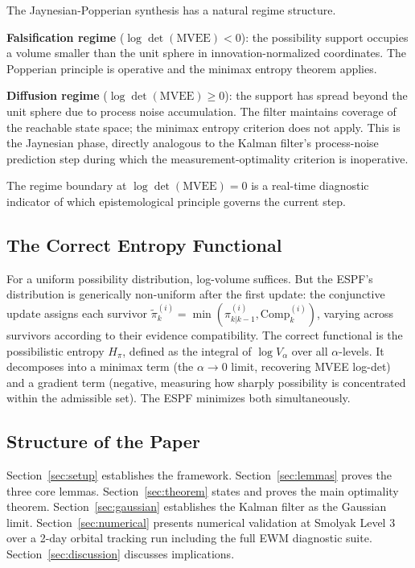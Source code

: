 \documentclass[12pt]{article}
\begin{document}
The Jaynesian-Popperian synthesis has a natural regime structure.

\textbf{Falsification regime} ($\log \det(\mathrm{MVEE}) < 0$): the possibility support occupies a volume smaller
than the unit sphere in innovation-normalized coordinates. The Popperian principle is operative
and the minimax entropy theorem applies.

\textbf{Diffusion regime} ($\log \det(\mathrm{MVEE}) \geq 0$): the support has spread beyond the unit sphere due
to process noise accumulation. The filter maintains coverage of the reachable state space; the
minimax entropy criterion does not apply. This is the Jaynesian phase, directly analogous to the
Kalman filter's process-noise prediction step during which the measurement-optimality criterion is
inoperative.

The regime boundary at $\log \det(\mathrm{MVEE}) = 0$ is a real-time diagnostic indicator of which epistemological principle governs the current step.

\subsection{The Correct Entropy Functional}

For a uniform possibility distribution, log-volume suffices. But the ESPF's distribution is generically non-uniform after the first update: the conjunctive update assigns each survivor $\tilde{\pi}^{(i)}_k =
\min(\pi^{(i)}_{k|k-1}, \mathrm{Comp}^{(i)}_k)$, varying across survivors according to their evidence compatibility. The correct functional is the possibilistic entropy $H_\pi$, defined as the integral of $\log V_\alpha$ over all $\alpha$-levels. It
decomposes into a minimax term (the $\alpha \to 0$ limit, recovering MVEE log-det) and a gradient term
(negative, measuring how sharply possibility is concentrated within the admissible set). The ESPF
minimizes both simultaneously.

\subsection{Structure of the Paper}

Section~\ref{sec:setup} establishes the framework. Section~\ref{sec:lemmas} proves the three core lemmas. Section~\ref{sec:theorem} states
and proves the main optimality theorem. Section~\ref{sec:gaussian} establishes the Kalman filter as the Gaussian
limit. Section~\ref{sec:numerical} presents numerical validation at Smolyak Level 3 over a 2-day orbital tracking run
including the full EWM diagnostic suite. Section~\ref{sec:discussion} discusses implications.
\end{document}
